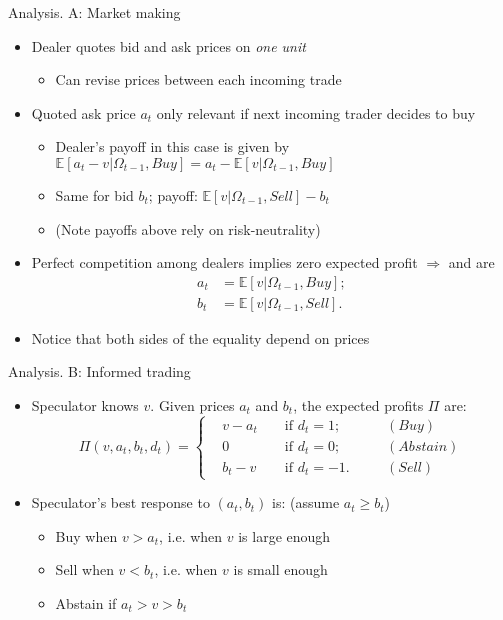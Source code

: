 \documentclass[english,10pt
,aspectratio=169
]{beamer}
\begin{document}
\begin{frame}{Analysis. A: Market making}
\begin{itemize}[<+->]
	\item Dealer quotes bid and ask prices on \textit{one unit}
	\begin{itemize}
		\item Can revise prices between each incoming trade
	\end{itemize}
	\item Quoted ask price $a_t$ only relevant if next incoming trader decides to buy
	\begin{itemize}
		\item Dealer's payoff in this case is given by $\mathbb{E}[a_t-v|\Omega_{t-1}, Buy] = a_t - \mathbb{E}[v|\Omega_{t-1}, Buy]$
		\item Same for bid $b_t$; payoff: $\mathbb{E}[v|\Omega_{t-1}, Sell] - b_t$
		\item (Note payoffs above rely on risk-neutrality)
	\end{itemize}
	\item Perfect competition among dealers implies zero expected profit $\Rightarrow$  and  are
	\begin{align*}
		a_t & = \mathbb{E}[v|\Omega_{t-1}, Buy]; \\
		b_t &= \mathbb{E}[v|\Omega_{t-1},  Sell].
	\end{align*}
	\item Notice that both sides of the equality depend on prices
\end{itemize}
\end{frame}


\begin{frame}{Analysis. B: Informed trading}
\begin{itemize}
	\item Speculator knows $v$. Given prices $a_t$ and $b_t$, the expected profits $\Pi$ are:
	\begin{equation*}
		\Pi(v,a_t,b_t,d_t)= \left\{
		\begin{aligned}
		&v - a_t  	&& \text{ if } d_t=1; \quad && (Buy)\\
		&0			&&\text{ if } d_t=0; \quad && (Abstain)\\
		&b_t - v 	&& \text{ if } d_t=-1. \quad && (Sell)
		\end{aligned}
		\right.
	\end{equation*}
	\pause
	\item Speculator's best response to $(a_t,b_t)$ is: (assume $a_t \geq b_t$)
	\begin{itemize}
		\item Buy when $v > a_t$, i.e. when $v$ is large enough
		\item Sell when $v<b_t$, i.e. when $v$ is small enough
		\item Abstain if $a_t > v > b_t$
	\end{itemize}
\end{itemize}
\end{frame}
\end{document}
